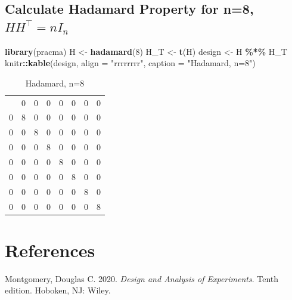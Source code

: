 \documentclass[
  12pt,
  a4paper,
]{article}
\newenvironment{Shaded}{\begin{snugshade}}{\end{snugshade}}
\newcommand{\AttributeTok}[1]{\textcolor[rgb]{0.13,0.29,0.53}{#1}}
\newcommand{\DecValTok}[1]{\textcolor[rgb]{0.00,0.00,0.81}{#1}}
\newcommand{\FunctionTok}[1]{\textcolor[rgb]{0.13,0.29,0.53}{\textbf{#1}}}
\newcommand{\NormalTok}[1]{#1}
\newcommand{\OtherTok}[1]{\textcolor[rgb]{0.56,0.35,0.01}{#1}}
\newcommand{\SpecialCharTok}[1]{\textcolor[rgb]{0.81,0.36,0.00}{\textbf{#1}}}
\newcommand{\StringTok}[1]{\textcolor[rgb]{0.31,0.60,0.02}{#1}}
\newlength{\cslhangindent}
\newlength{\cslentryspacingunit} %
\newenvironment{CSLReferences}[2] %
 {%
  \setlength{\parindent}{0pt}
  \ifodd #1
  \let\oldpar\par
  \def\par{\hangindent=\cslhangindent\oldpar}
  \fi
  \setlength{\parskip}{#2\cslentryspacingunit}
 }%
 {}
\numberwithin{equation}{section}
\theoremstyle{plain}
\theoremstyle{definition}
\theoremstyle{remark}
\theoremstyle{note}
\begin{document}
\hypertarget{calculate-hadamard-property-for-n8-h-htopn-i_n}{%
\subsection{\texorpdfstring{Calculate Hadamard Property for n=8,
\(H H^{\top}=n I_n\)}{Calculate Hadamard Property for n=8, H H\^{}\{\textbackslash top\}=n I\_n}}\label{calculate-hadamard-property-for-n8-h-htopn-i_n}}

\begin{Shaded}
\begin{Highlighting}[]
\FunctionTok{library}\NormalTok{(pracma)}
\NormalTok{H }\OtherTok{\textless{}{-}} \FunctionTok{hadamard}\NormalTok{(}\DecValTok{8}\NormalTok{)}
\NormalTok{H\_T }\OtherTok{\textless{}{-}} \FunctionTok{t}\NormalTok{(H)}
\NormalTok{design }\OtherTok{\textless{}{-}}\NormalTok{ H }\SpecialCharTok{\%*\%}\NormalTok{ H\_T}
\NormalTok{knitr}\SpecialCharTok{::}\FunctionTok{kable}\NormalTok{(design, }\AttributeTok{align =} \StringTok{"rrrrrrrr"}\NormalTok{, }\AttributeTok{caption =} \StringTok{"Hadamard, n=8"}\NormalTok{)}
\end{Highlighting}
\end{Shaded}

\begin{longtable}[]{@{}rrrrrrrr@{}}
\caption{Hadamard, n=8}\tabularnewline
\toprule\noalign{}
\endfirsthead
\endhead
\bottomrule\noalign{}
\endlastfoot
8 & 0 & 0 & 0 & 0 & 0 & 0 & 0 \\
0 & 8 & 0 & 0 & 0 & 0 & 0 & 0 \\
0 & 0 & 8 & 0 & 0 & 0 & 0 & 0 \\
0 & 0 & 0 & 8 & 0 & 0 & 0 & 0 \\
0 & 0 & 0 & 0 & 8 & 0 & 0 & 0 \\
0 & 0 & 0 & 0 & 0 & 8 & 0 & 0 \\
0 & 0 & 0 & 0 & 0 & 0 & 8 & 0 \\
0 & 0 & 0 & 0 & 0 & 0 & 0 & 8 \\
\end{longtable}

\newpage

\hypertarget{references}{%
\section*{References}\label{references}}

\hypertarget{refs}{}
\begin{CSLReferences}{1}{0}
\leavevmode{}%
Montgomery, Douglas C. 2020. \emph{Design and {Analysis} of
{Experiments}}. Tenth edition. Hoboken, NJ: Wiley.

\end{CSLReferences}
\end{document}
